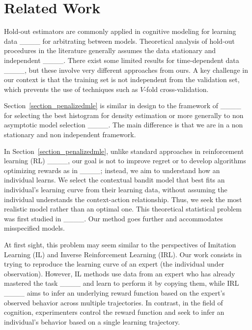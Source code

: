 \section{Related Work}
\label{section_relatedwork}

Hold-out estimators are commonly applied in cognitive modeling for learning data ____ for arbitrating between models. Theoretical analysis of hold-out procedures in the literature generally assumes the data stationary and independent ____. There exist some limited results for time-dependent data ____, but these involve very different approaches from ours. A key challenge in our context is that the training set is not independent from the validation set, which prevents the use of %
techniques such as $V$-fold cross-validation.

Section~\ref{section_penalizedmle} is similar in design to the framework of  ____ for selecting the best histogram for density estimation or more generally to non asymptotic model selection ____. The main difference is that we are in a non stationary and non independent framework. %

In Section~\ref{section_penalizedmle}, unlike standard approaches in reinforcement learning (RL) ____, our goal is not to improve regret or to develop algorithms optimizing rewards as in ____; instead, we aim to understand how an individual learns. We select the contextual bandit model that best fits an individual's learning curve from their learning data, without assuming the individual understands the context-action relationship. Thus, we seek the most realistic model rather than an optimal one. This theoretical statistical problem was first studied in ____.%
Our method goes further and accommodates misspecified models.


At first sight, this problem may seem similar to the perspectives of Imitation Learning (IL) and Inverse Reinforcement Learning (IRL).
Our work consists in trying to reproduce the learning curve of an expert (the individual under observation).
However, IL methods use data from an expert who has already mastered the task ____ and learn to perform it by copying them, while IRL ____ aims to infer an underlying reward function based on the expert's observed behavior across multiple trajectories. In contrast, in the field of cognition, experimenters control the reward function and seek to infer an individual's behavior based on a single learning trajectory.



